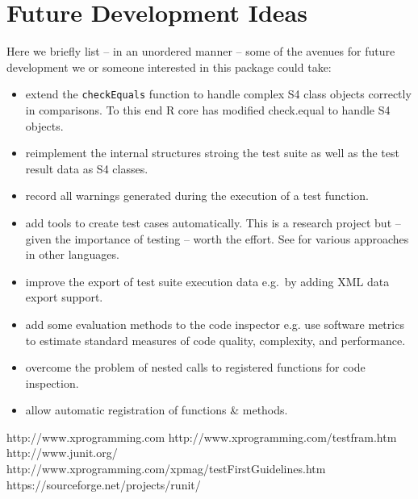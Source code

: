 \documentclass[12pt, a4paper]{article}
\begin{document}
\section{Future Development Ideas}
Here we briefly list -- in an unordered manner -- some of the avenues for future development we or someone interested in this package could take:
\begin{itemize}
\item{extend the {\tt checkEquals} function to handle complex S4 class objects correctly in comparisons. To this end R core has modified check.equal to handle S4 objects.}
\item{reimplement the internal structures stroing the test suite as well as the test result data as S4 classes.}
\item{record all warnings generated during the execution of a test function.}
\item{add tools to create test cases automatically. This is a research project but -- given the importance of testing -- worth the effort. See \cite{junit} for various approaches in other languages.}
\item{improve the export of test suite execution data e.g.\ by adding XML data export support.}
\item{add some evaluation methods to the code inspector e.g. use software metrics to estimate standard measures of code quality, complexity, and performance.}
\item{overcome the problem of nested calls to registered functions for code inspection.}
\item{allow automatic registration of functions \& methods.}
\end{itemize}

\begin{thebibliography}{99}
% 
 http://www.xprogramming.com
 http://www.xprogramming.com/testfram.htm
 http://www.junit.org/
 http://www.xprogramming.com/xpmag/testFirstGuidelines.htm
 https://sourceforge.net/projects/runit/
\end{thebibliography}
\end{document}
